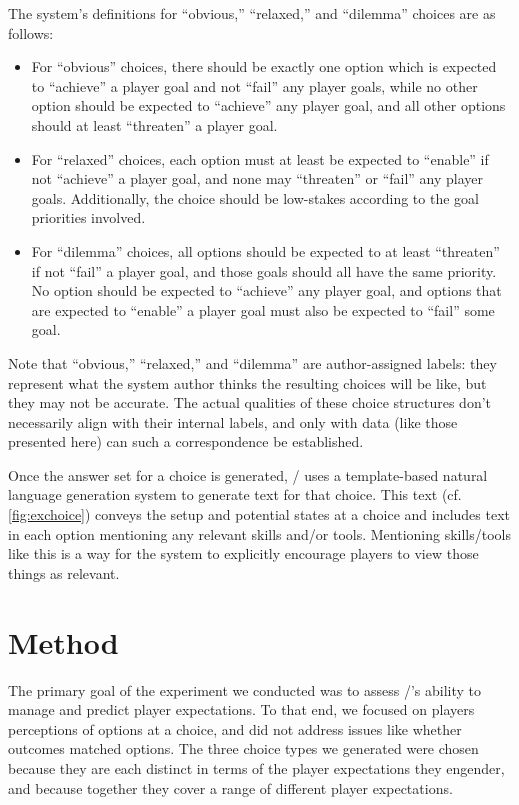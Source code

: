 The system's definitions for ``obvious,'' ``relaxed,'' and ``dilemma'' choices are as follows:
%
\begin{itemize}
  \item For ``obvious'' choices, there should be exactly one option which is expected to ``achieve'' a player goal and not ``fail'' any player goals, while no other option should be expected to ``achieve'' any player goal, and all other options should at least ``threaten'' a player goal.
  \item For ``relaxed'' choices, each option must at least be expected to ``enable'' if not ``achieve'' a player goal, and none may ``threaten'' or ``fail'' any player goals. Additionally, the choice should be low-stakes according to the goal priorities involved.
  \item For ``dilemma'' choices, all options should be expected to at least ``threaten'' if not ``fail'' a player goal, and those goals should all have the same priority. No option should be expected to ``achieve'' any player goal, and options that are expected to ``enable'' a player goal must also be expected to ``fail'' some goal.
\end{itemize}
%
Note that ``obvious,'' ``relaxed,'' and ``dilemma'' are author-assigned labels: they represent what the system author thinks the resulting choices will be like, but they may not be accurate.
%
The actual qualities of these choice structures don't necessarily align with their internal labels, and only with data (like those presented here) can such a correspondence be established.


Once the answer set for a choice is generated, \dunyazad/ uses a template-based natural language generation system to generate text for that choice.
%
This text (cf. \cref{fig:exchoice}) conveys the setup and potential states at a choice and includes text in each option mentioning any relevant skills and/or tools.
%
Mentioning skills/tools like this is a way for the system to explicitly encourage players to view those things as relevant.

\section{Method}

The primary goal of the experiment we conducted was to assess \dunyazad/'s ability to manage and predict player expectations.
%
To that end, we focused on players perceptions of options at a choice, and did not address issues like whether outcomes matched options.
%
The three choice types we generated were chosen because they are each distinct in terms of the player expectations they engender, and because together they cover a range of different player expectations.


